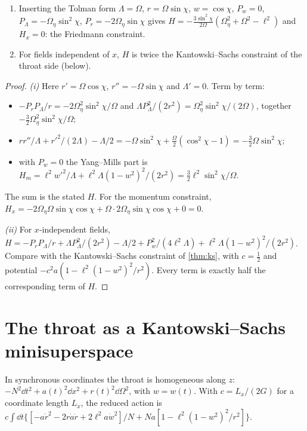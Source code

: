 \begin{proposition}\label{prop:bothconstraints}\ver\
\begin{enumerate}[label=(\roman*)]
\item Inserting the Tolman form $\Lambda=\Omega$, $r=\Omega\sin\chi$, $w=\cos\chi$, $P_w=0$, $P_\Lambda=-\Omega_\eta\sin^2\chi$, $P_r=-2\Omega_\eta\sin\chi$ gives $H=-\frac{3\sin^2\chi}{2\Omega}(\Omega_\eta^2+\Omega^2-\ell^2)$ and $H_x=0$: the Friedmann constraint.
\item For fields independent of $x$, $H$ is twice the Kantowski--Sachs constraint of the throat side (below).
\end{enumerate}
\end{proposition}
\begin{proof}
\emph{(i)} Here $r'=\Omega\cos\chi$, $r''=-\Omega\sin\chi$ and $\Lambda'=0$. Term by term:
\begin{itemize}[nosep]
\item $-P_rP_\Lambda/r=-2\Omega_\eta^2\sin^2\chi/\Omega$ and $\Lambda P_\Lambda^2/(2r^2)=\Omega_\eta^2\sin^2\chi/(2\Omega)$, together $-\frac32\Omega_\eta^2\sin^2\chi/\Omega$;
\item $rr''/\Lambda+r'^2/(2\Lambda)-\Lambda/2=-\Omega\sin^2\chi+\frac\Omega2(\cos^2\chi-1)=-\frac32\Omega\sin^2\chi$;
\item with $P_w=0$ the Yang--Mills part is $H_m=\ell^2w'^2/\Lambda+\ell^2\Lambda(1-w^2)^2/(2r^2)=\frac32\ell^2\sin^2\chi/\Omega$.
\end{itemize}
The sum is the stated $H$. For the momentum constraint, $H_x=-2\Omega_\eta\Omega\sin\chi\cos\chi+\Omega\cdot2\Omega_\eta\sin\chi\cos\chi+0=0$.

\emph{(ii)} For $x$-independent fields, $H=-P_rP_\Lambda/r+\Lambda P_\Lambda^2/(2r^2)-\Lambda/2+P_w^2/(4\ell^2\Lambda)+\ell^2\Lambda(1-w^2)^2/(2r^2)$. Compare with the Kantowski--Sachs constraint of \cref{thm:ks}, with $c=\frac12$ and potential $-c^2a(1-\ell^2(1-w^2)^2/r^2)$. Every term is exactly half the corresponding term of $H$.
\end{proof}


\section{The throat as a Kantowski--Sachs minisuperspace}

In synchronous coordinates the throat is homogeneous along $z$: $-N^2\dd t^2+a(t)^2\dd x^2+r(t)^2\dd\Omega^2$, with $w=w(t)$. With $c=L_x/(2G)$ for a coordinate length $L_x$, the reduced action is $c\int\dd t\{[-a\dot r^2-2r\dot a\dot r+2\ell^2a\dot w^2]/N+Na[1-\ell^2(1-w^2)^2/r^2]\}$.

